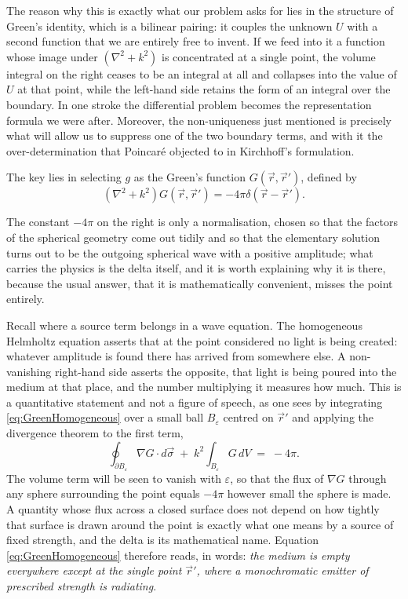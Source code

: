 		The reason why this is exactly what our problem asks for lies in the structure of Green's identity, which is a bilinear pairing: it couples the unknown $U$ with a second function that we are entirely free to invent. If we feed into it a function whose image under $(\nabla^{2}+k^{2})$ is concentrated at a single point, the volume integral on the right ceases to be an integral at all and collapses into the value of $U$ at that point, while the left-hand side retains the form of an integral over the boundary. In one stroke the differential problem becomes the representation formula we were after. Moreover, the non-uniqueness just mentioned is precisely what will allow us to suppress one of the two boundary terms, and with it the over-determination that Poincaré objected to in Kirchhoff's formulation.

		The key lies in selecting $g$ as the Green's function $G(\vec{r}, \vec{r}')$, defined by
		\begin{equation}\label{eq:GreenHomogeneous}
			\left(\nabla^2 + k^2\right)G(\vec{r}, \vec{r}') = -4\pi \delta(\vec{r} - \vec{r}').
		\end{equation}

		The constant $-4\pi$ on the right is only a normalisation, chosen so that the factors of the spherical geometry come out tidily and so that the elementary solution turns out to be the outgoing spherical wave with a positive amplitude; what carries the physics is the delta itself, and it is worth explaining why it is there, because the usual answer, that it is mathematically convenient, misses the point entirely.

		Recall where a source term belongs in a wave equation. The homogeneous Helmholtz equation asserts that at the point considered no light is being created: whatever amplitude is found there has arrived from somewhere else. A non-vanishing right-hand side asserts the opposite, that light is being poured into the medium at that place, and the number multiplying it measures how much. This is a quantitative statement and not a figure of speech, as one sees by integrating \eqref{eq:GreenHomogeneous} over a small ball $B_{\varepsilon}$ centred on $\vec{r}'$ and applying the divergence theorem to the first term,
		\begin{equation}\label{eq:GreenFlux}
			\oint_{\partial B_{\varepsilon}} \nabla G \cdot d\vec{\sigma} \;+\; k^{2}\int_{B_{\varepsilon}} G\, dV \;=\; -4\pi .
		\end{equation}
		The volume term will be seen to vanish with $\varepsilon$, so that the flux of $\nabla G$ through any sphere surrounding the point equals $-4\pi$ however small the sphere is made. A quantity whose flux across a closed surface does not depend on how tightly that surface is drawn around the point is exactly what one means by a source of fixed strength, and the delta is its mathematical name. Equation \eqref{eq:GreenHomogeneous} therefore reads, in words: \textit{the medium is empty everywhere except at the single point $\vec{r}'$, where a monochromatic emitter of prescribed strength is radiating}.


